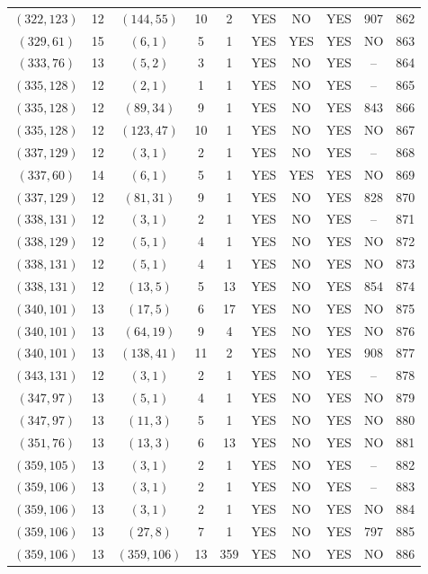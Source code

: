 \begin{longtable}{|c|c|c|c|c|c|c|c|c|c|}
$(322, 123)$ & 12 & $(144, 55)$ & 10 & 2 & YES & NO & YES & 907 & 862\\
$(329, 61)$ & 15 & $(6, 1)$ & 5 & 1 & YES & YES & YES & NO & 863\\
$(333, 76)$ & 13 & $(5, 2)$ & 3 & 1 & YES & NO & YES & -- & 864\\
$(335, 128)$ & 12 & $(2, 1)$ & 1 & 1 & YES & NO & YES & -- & 865\\
$(335, 128)$ & 12 & $(89, 34)$ & 9 & 1 & YES & NO & YES & 843 & 866\\
$(335, 128)$ & 12 & $(123, 47)$ & 10 & 1 & YES & NO & YES & NO & 867\\
$(337, 129)$ & 12 & $(3, 1)$ & 2 & 1 & YES & NO & YES & -- & 868\\
$(337, 60)$ & 14 & $(6, 1)$ & 5 & 1 & YES & YES & YES & NO & 869\\
$(337, 129)$ & 12 & $(81, 31)$ & 9 & 1 & YES & NO & YES & 828 & 870\\
$(338, 131)$ & 12 & $(3, 1)$ & 2 & 1 & YES & NO & YES & -- & 871\\
$(338, 129)$ & 12 & $(5, 1)$ & 4 & 1 & YES & NO & YES & NO & 872\\
$(338, 131)$ & 12 & $(5, 1)$ & 4 & 1 & YES & NO & YES & NO & 873\\
$(338, 131)$ & 12 & $(13, 5)$ & 5 & 13 & YES & NO & YES & 854 & 874\\
$(340, 101)$ & 13 & $(17, 5)$ & 6 & 17 & YES & NO & YES & NO & 875\\
$(340, 101)$ & 13 & $(64, 19)$ & 9 & 4 & YES & NO & YES & NO & 876\\
$(340, 101)$ & 13 & $(138, 41)$ & 11 & 2 & YES & NO & YES & 908 & 877\\
$(343, 131)$ & 12 & $(3, 1)$ & 2 & 1 & YES & NO & YES & -- & 878\\
$(347, 97)$ & 13 & $(5, 1)$ & 4 & 1 & YES & NO & YES & NO & 879\\
$(347, 97)$ & 13 & $(11, 3)$ & 5 & 1 & YES & NO & YES & NO & 880\\
$(351, 76)$ & 13 & $(13, 3)$ & 6 & 13 & YES & NO & YES & NO & 881\\
$(359, 105)$ & 13 & $(3, 1)$ & 2 & 1 & YES & NO & YES & -- & 882\\
$(359, 106)$ & 13 & $(3, 1)$ & 2 & 1 & YES & NO & YES & -- & 883\\
$(359, 106)$ & 13 & $(3, 1)$ & 2 & 1 & YES & NO & YES & NO & 884\\
$(359, 106)$ & 13 & $(27, 8)$ & 7 & 1 & YES & NO & YES & 797 & 885\\
$(359, 106)$ & 13 & $(359, 106)$ & 13 & 359 & YES & NO & YES & NO & 886\\

\end{longtable}
